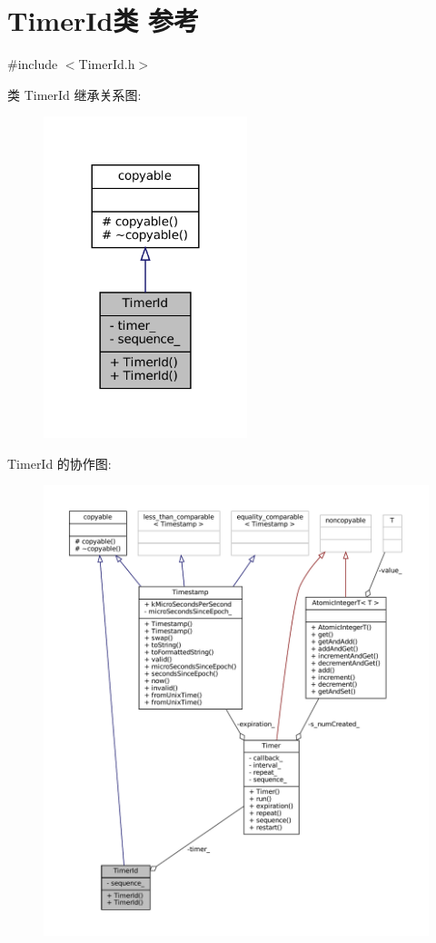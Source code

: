 \hypertarget{classmuduo_1_1net_1_1TimerId}{}\section{Timer\+Id类 参考}
\label{classmuduo_1_1net_1_1TimerId}


{\ttfamily \#include $<$Timer\+Id.\+h$>$}



类 Timer\+Id 继承关系图\+:
\nopagebreak
\begin{figure}[H]
\begin{center}
\leavevmode
\includegraphics[width=168pt]{classmuduo_1_1net_1_1TimerId__inherit__graph}
\end{center}
\end{figure}


Timer\+Id 的协作图\+:
\nopagebreak
\begin{figure}[H]
\begin{center}
\leavevmode
\includegraphics[width=350pt]{classmuduo_1_1net_1_1TimerId__coll__graph}
\end{center}
\end{figure}
